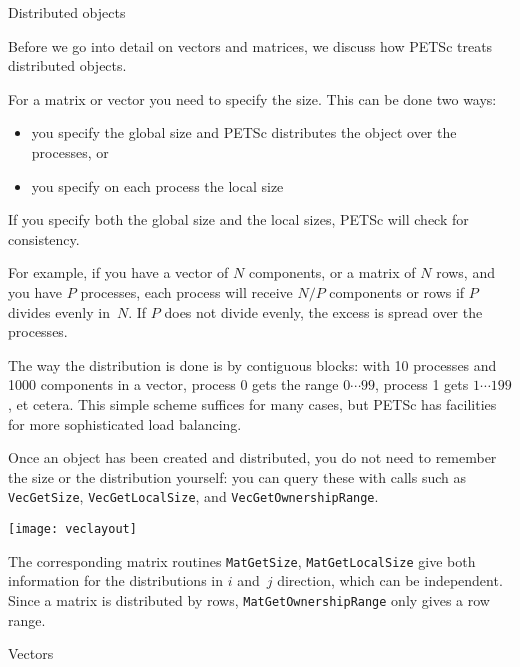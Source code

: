 
 {Distributed objects}

Before we go into detail on vectors and matrices, we discuss how PETSc
treats distributed objects.

For a matrix or vector you need to specify the size. This can be done two ways:
\begin{itemize}
\item you specify the global size and PETSc distributes the object over the processes, or
\item you specify on each process the local size
\end{itemize}
If you specify both the global size and the local sizes, PETSc will check for consistency.

For example, if you have a vector of $N$ components, or a matrix of $N$
rows, and you have $P$ processes, each process will receive $N/P$
components or rows if $P$ divides evenly in~$N$. If $P$ does not divide
evenly, the excess is spread over the processes.

The way the distribution is done is by contiguous blocks: with 10
processes and 1000 components in a vector, process 0 gets the range
$0\cdots99$, process 1 gets $1\cdots199$, et cetera. This simple scheme suffices for
many cases, but PETSc has facilities for more sophisticated load
balancing.

Once an object has been created and distributed, you do not need to
remember the size or the distribution yourself: you can query these
with calls such as \lstinline{VecGetSize},
\lstinline{VecGetLocalSize}, and \lstinline{VecGetOwnershipRange}.

\texttt{[image: veclayout]}

The
corresponding matrix routines \lstinline{MatGetSize},
\lstinline{MatGetLocalSize} give both information for the
distributions in $i$ and~$j$ direction, which can be
independent. Since a matrix is distributed by rows,
\lstinline{MatGetOwnershipRange} only gives a row range.

 {Vectors}

